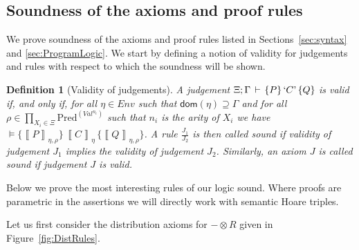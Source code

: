 \documentclass{LMCS}
\newtheorem{definition}[theorem]{Definition}
\theoremstyle{remark}
\newcommand{\Val}{\ensuremath{\mathit{Val}}\xspace}
\newcommand{\QUOTE}[1]{\textnormal{`\ensuremath{#1}'}}
\newcommand{\dom}[1]{\ensuremath{\mathsf{dom}({#1})}}
\newcommand{\Env}{\ensuremath{\textit{Env}}\xspace}
\newcommand{\triple}[3]{{\ensuremath{\!\left.\{ #1 \}\, #2\, \{  #3 \}\!\right.}}}
\newcommand{\den}[1]{\left\llbracket #1
  \right\rrbracket}
\newcommand{\Pred}{\ensuremath{\mathrm{Pred}}\xspace}
\newcommand{\X}{\ensuremath{\Xi}}
\begin{document}
\subsection{Soundness of the axioms and proof rules}


We prove soundness of  the axioms and proof rules listed in 
Sections~\ref{sec:syntax} and \ref{sec:ProgramLogic}.
We start by defining  a notion of validity for judgements and rules with respect to which the soundness will be shown. 

\begin{definition}[Validity of judgements]
A judgement $\X;\Gamma \,\adash\,
\triple{P}{\QUOTE{C}}{Q}$ is \emph{valid} if, and only if, for all $\eta \in \Env $ such that 
$\dom\eta\supseteq \Gamma$ and for all $\rho \in \prod_{X_i\in\X}\Pred^{(\Val^{n_i})}$
such that  $n_i$ is the arity of $X_i$ we have
$\models \triple{\den{P}_{\eta,\rho}}{\den{C}_{\eta}}{\den{Q}_{\eta,\rho}}$.
A   rule $\frac{J_1}{J_2}$ is then called \emph{sound} if validity of judgement $J_1$
implies the validity of judgement $J_2$. Similarly, an axiom $J$ is called \emph{sound}
if  judgement $J$ is valid.
\end{definition}
Below we prove the most interesting rules of our logic sound.  Where proofs are parametric in  the assertions
  we will directly work with semantic Hoare triples. 


Let us first consider the distribution axioms for $-\otimes R$ given 
in Figure~\ref{fig:DistRules}.
\end{document}
